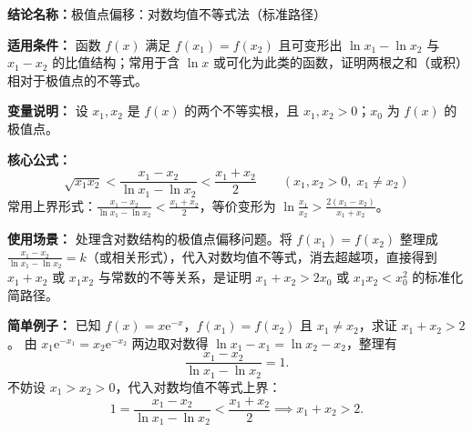 \textbf{结论名称：}极值点偏移：对数均值不等式法（标准路径）

\textbf{适用条件：} 函数 \(f(x)\) 满足 \(f(x_1)=f(x_2)\) 且可变形出 \(\ln x_1-\ln x_2\) 与 \(x_1-x_2\) 的比值结构；常用于含 \(\ln x\) 或可化为此类的函数，证明两根之和（或积）相对于极值点的不等式。

\textbf{变量说明：} 设 \(x_1,x_2\) 是 \(f(x)\) 的两个不等实根，且 \(x_1,x_2>0\)；\(x_0\) 为 \(f(x)\) 的极值点。

\textbf{核心公式：}
\[
\boxed{\sqrt{x_1x_2} < \frac{x_1-x_2}{\ln x_1-\ln x_2} < \frac{x_1+x_2}{2}\qquad (x_1,x_2>0,\;x_1\neq x_2)}
\]
常用上界形式：\(\displaystyle\frac{x_1-x_2}{\ln x_1-\ln x_2}<\frac{x_1+x_2}{2}\)，等价变形为 \(\displaystyle\ln\frac{x_1}{x_2}>\frac{2(x_1-x_2)}{x_1+x_2}\)。

\textbf{使用场景：} 处理含对数结构的极值点偏移问题。将 \(f(x_1)=f(x_2)\) 整理成 \(\displaystyle\frac{x_1-x_2}{\ln x_1-\ln x_2}=k\)（或相关形式），代入对数均值不等式，消去超越项，直接得到 \(x_1+x_2\) 或 \(x_1x_2\) 与常数的不等关系，是证明 \(x_1+x_2>2x_0\) 或 \(x_1x_2<x_0^2\) 的标准化简路径。

\textbf{简单例子：} 已知 \(f(x)=x\mathrm{e}^{-x}\)，\(f(x_1)=f(x_2)\) 且 \(x_1\neq x_2\)，求证 \(x_1+x_2>2\)。
由 \(x_1\mathrm{e}^{-x_1}=x_2\mathrm{e}^{-x_2}\) 两边取对数得 \(\ln x_1-x_1=\ln x_2-x_2\)，整理有
\[
\frac{x_1-x_2}{\ln x_1-\ln x_2}=1.
\]
不妨设 \(x_1>x_2>0\)，代入对数均值不等式上界：
\[
1=\frac{x_1-x_2}{\ln x_1-\ln x_2}<\frac{x_1+x_2}{2}\implies x_1+x_2>2.
\]